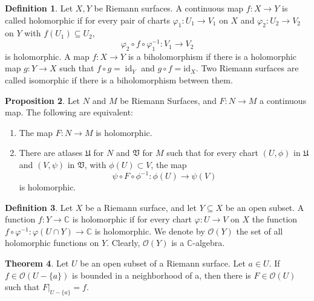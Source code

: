 \documentclass[12pt,a4paper]{book}
\newenvironment{enu}{\begin{enumerate}[(1)]}{\end{enumerate}}
\theoremstyle{definition}
\newtheorem{defn}{Definition}[section]
\newtheorem{theo}[defn]{Theorem}
\newtheorem{prop}[defn]{Proposition}
\begin{document}
\begin{defn}
    Let $X, Y$ be Riemann surfaces. A continuous map $f: X \rightarrow Y$ is called holomorphic if for every pair of charts $\varphi_1: U_1 \rightarrow V_1$ on $X$ and $\varphi_2: U_2 \rightarrow V_2$ on $Y$ with $f\left(U_1\right) \subseteq U_2$,
    $$
        \varphi_2 \circ f \circ \varphi_1^{-1}: V_1 \rightarrow V_2
    $$
    is holomorphic. A map $f: X \rightarrow Y$ is a biholomorphism if there is a holomorphic map $g: Y \rightarrow X$ such that $f \circ g=\operatorname{id}_Y$ and $g \circ f=\mathrm{id}_X$. Two Riemann surfaces are called isomorphic if there is a biholomorphism between them.
\end{defn}
\begin{prop}
    Let $N$ and $M$ be Riemann Surfaces, and $F: N \rightarrow M$ a continuous map. The following are equivalent:
    \begin{enu}
        \item The map $F: N \rightarrow M$ is holomorphic.
        \item There are atlases $\mathfrak{U}$ for $N$ and $\mathfrak{V}$ for $M$ such that for every chart $(U, \phi)$ in $\mathfrak{U}$ and $(V, \psi)$ in $\mathfrak{V}$, with $\phi(U)\subset V$, the map
        $$
            \psi \circ F \circ \phi^{-1}: \phi(U) \rightarrow \psi(V)
        $$
        is holomorphic.
    \end{enu}
\end{prop}
\begin{defn}
    Let $X$ be a Riemann surface, and let $Y \subseteq X$ be an open subset. A function $f: Y \rightarrow \mathbb{C}$ is holomorphic if for every chart $\varphi: U \rightarrow V$ on $X$ the function $f \circ \varphi^{-1}: \varphi(U \cap Y) \rightarrow \mathbb{C}$ is holomorphic. We denote by $\mathcal{O}(Y)$ the set of all holomorphic functions on $Y$. Clearly, $\mathcal{O}(Y)$ is a $\mathbb{C}$-algebra.
\end{defn}
\begin{theo}
    Let $U$ be an open subset of a Riemann surface. Let $a \in U$. If $f \in \mathcal{O}(U-\{a\})$ is bounded in a neighborhood of a, then there is $F \in \mathcal{O}(U)$ such that $\left.F\right|_{U-\{a\}}=f$.
\end{theo}
\end{document}
